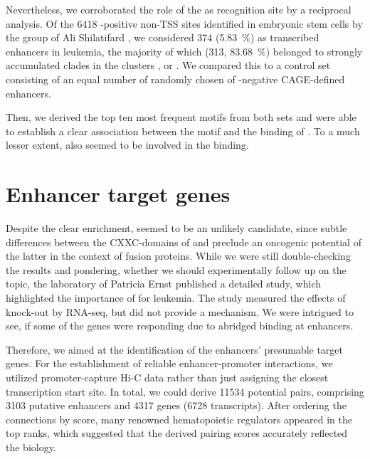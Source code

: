 Nevertheless, we corroborated the role of the \motifmlltwo as  recognition site by a reciprocal analysis. Of the \num{6418} -positive non-TSS sites identified in embryonic stem cells by the group of Ali Shilatifard \cite{Hu2017}, we considered \num{374} (\SI{5.83}{\percent}) as transcribed enhancers in \mllafnine leukemia, the majority of which (\num{313}, \SI{83.68}{\percent}) belonged to strongly accumulated clades in the clusters ,  or . We compared this to a control set consisting of an equal number of randomly chosen of -negative CAGE-defined enhancers.

Then, we derived the top ten most frequent motifs from both sets and were able to establish a clear association between the motif \motifmlltwo and the binding of . To a much lesser extent, also \motifmlltwoc seemed to be involved in the binding. 

\section{Enhancer target genes}
\label{chap:r:enhancers:targets}\label{chap:r:enhancers:targets:assignment}\label{chap:r:enhancers:targets:genes}

Despite the clear enrichment,  seemed to be an unlikely candidate, since subtle differences between the CXXC-domains of  and  preclude an oncogenic potential of the latter in the context of fusion proteins\cite{Bach2009}. While we were still double-checking the results and pondering, whether we should experimentally follow up on the topic, the laboratory of Patricia Ernst published a detailed study, which highlighted the importance of  for \mllafnine leukemia\cite{Chen2017a}. The study measured the effects of  knock-out by RNA-seq, but did not provide a mechanism. We were intrigued to see, if some of the genes were responding due to abridged binding at enhancers. 

\fyfrank

Therefore, we aimed at the identification of the enhancers' presumable target genes. For the establishment of reliable enhancer-promoter interactions, we utilized promoter-capture Hi-C data rather than just assigning the closest transcription start site. In total, we could derive \num{11534} potential pairs, comprising \num{3103} putative enhancers and \num{4317} genes (\num{6728} transcripts). After ordering the connections by score, many renowned hematopoietic regulators appeared in the top ranks, which suggested that the derived pairing scores accurately reflected the biology. 

